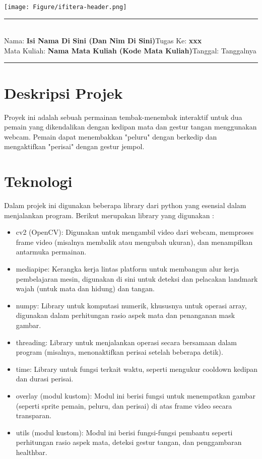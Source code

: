 \documentclass[11pt,a4paper]{article}
\newcommand{\student}{\textbf{Isi Nama Di Sini (Dan Nim Di Sini)}}
\newcommand{\course}{\textbf{Nama Mata Kuliah (Kode Mata Kuliah)}}
\newcommand{\assignment}{\textbf{xxx}}
\begin{document}
\thispagestyle{empty}
\begin{center}
	\texttt{[image: Figure/ifitera-header.png]}
	\vspace{0.1cm}
\end{center}
\noindent
\rule{17cm}{0.2cm}\\[0.3cm]
Nama: \student \hfill Tugas Ke: \assignment\\[0.1cm]
Mata Kuliah: \course \hfill Tanggal: Tanggalnya\\
\rule{17cm}{0.05cm}
\vspace{0.1cm}



\section{Deskripsi Projek}
Proyek ini adalah sebuah permainan tembak-menembak interaktif untuk dua pemain yang dikendalikan dengan kedipan mata dan gestur tangan menggunakan webcam. Pemain dapat menembakkan "peluru" dengan berkedip dan mengaktifkan "perisai" dengan gestur jempol.

\section{Teknologi}
Dalam projek ini digunakan beberapa library dari python yang esensial dalam menjalankan program. Berikut merupakan library yang digunakan :
\begin{itemize}
    \item cv2 (OpenCV): Digunakan untuk mengambil video dari webcam, memproses frame video (misalnya membalik atau mengubah ukuran), dan menampilkan antarmuka permainan.
    \item mediapipe: Kerangka kerja lintas platform untuk membangun alur kerja pembelajaran mesin, digunakan di sini untuk deteksi dan pelacakan landmark wajah (untuk mata dan hidung) dan tangan.
    \item numpy: Library untuk komputasi numerik, khususnya untuk operasi array, digunakan dalam perhitungan rasio aspek mata dan penanganan mask gambar.
    \item threading: Library untuk menjalankan operasi secara bersamaan dalam program (misalnya, menonaktifkan perisai setelah beberapa detik).
    \item time: Library untuk fungsi terkait waktu, seperti mengukur cooldown kedipan dan durasi perisai.
    \item overlay (modul kustom): Modul ini berisi fungsi untuk menempatkan gambar (seperti sprite pemain, peluru, dan perisai) di atas frame video secara transparan.
    \item utils (modul kustom): Modul ini berisi fungsi-fungsi pembantu seperti perhitungan rasio aspek mata, deteksi gestur tangan, dan penggambaran healthbar.
\end{itemize}
\end{document}
